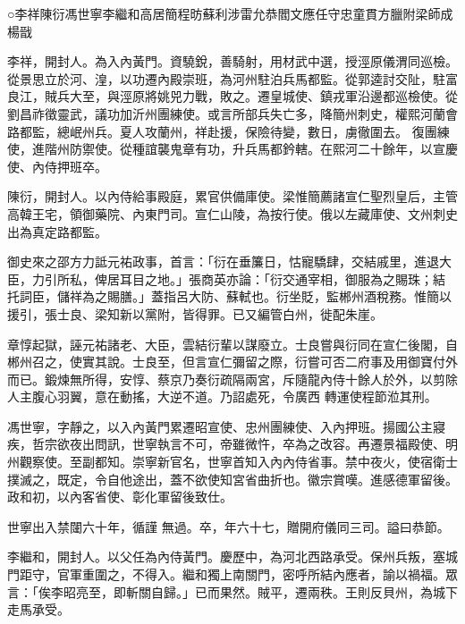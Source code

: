 
\begin{pinyinscope}

 ○李祥陳衍馮世寧李繼和高居簡程昉蘇利涉雷允恭閻文應任守忠童貫方臘附梁師成
 楊戩



 李祥，開封人。為入內黃門。資驍銳，善騎射，用材武中選，授涇原儀渭同巡檢。從景思立於河、湟，以功遷內殿崇班，為河州駐泊兵馬都監。從郭逵討交阯，駐富良江，賊兵大至，與涇原將姚兕力戰，敗之。遷皇城使、鎮戎軍沿邊都巡檢使。從劉昌祚徵靈武，議功加沂州團練使。或言所部兵失亡多，降簡州刺史，權熙河蘭會路都監，總岷州兵。夏人攻蘭州，祥赴援，保險待變，數日，虜徹圍去。
 復團練使，進階州防禦使。從種誼襲鬼章有功，升兵馬都鈐轄。在熙河二十餘年，以宣慶使、內侍押班卒。



 陳衍，開封人。以內侍給事殿庭，累官供備庫使。梁惟簡薦諸宣仁聖烈皇后，主管高韓王宅，領御藥院、內東門司。宣仁山陵，為按行使。俄以左藏庫使、文州刺史出為真定路都監。



 御史來之邵方力詆元祐政事，首言：「衍在垂簾日，怙寵驕肆，交結戚里，進退大臣，力引所私，俾居耳目之地。」張商英亦論：「衍交通宰相，御服為之賜珠；結
 托詞臣，儲祥為之賜膳。」蓋指呂大防、蘇軾也。衍坐貶，監郴州酒稅務。惟簡以援引，張士良、梁知新以黨附，皆得罪。已又編管白州，徙配朱崖。



 章惇起獄，誣元祐諸老、大臣，雲結衍輩以謀廢立。士良嘗與衍同在宣仁後閣，自郴州召之，使實其說。士良至，但言宣仁彌留之際，衍嘗可否二府事及用御寶付外而已。鍛煉無所得，安惇、蔡京乃奏衍疏隔兩宮，斥隨龍內侍十餘人於外，以剪除人主腹心羽翼，意在動搖，大逆不道。乃詔處死，令廣西
 轉運使程節涖其刑。



 馮世寧，字靜之，以入內黃門累遷昭宣使、忠州團練使、入內押班。揚國公主寢疾，哲宗欲夜出問訊，世寧執言不可，帝雖微忤，卒為之改容。再遷景福殿使、明州觀察使。至副都知。崇寧新官名，世寧首知入內內侍省事。禁中夜火，使宿衛士撲滅之，既定，令自他途出，蓋不欲使知宮省曲折也。徽宗賞嘆。進感德軍留後。政和初，以內客省使、彰化軍留後致仕。



 世寧出入禁闥六十年，循謹
 無過。卒，年六十七，贈開府儀同三司。謚曰恭節。



 李繼和，開封人。以父任為內侍黃門。慶歷中，為河北西路承受。保州兵叛，塞城門距守，官軍重圍之，不得入。繼和獨上南關門，密呼所結內應者，諭以禍福。眾言：「俟李昭亮至，即斬關自歸。」已而果然。賊平，遷兩秩。王則反貝州，為城下走馬承受。




\end{pinyinscope}
